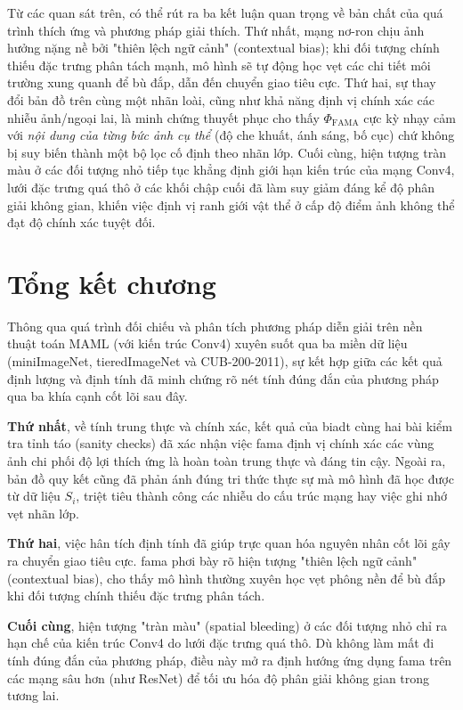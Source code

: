 Từ các quan sát trên, có thể rút ra ba kết luận quan trọng về bản chất của quá trình thích ứng và phương pháp giải thích. Thứ nhất, mạng nơ-ron chịu ảnh hưởng nặng nề bởi "thiên lệch ngữ cảnh" (contextual bias); khi đối tượng chính thiếu đặc trưng phân tách mạnh, mô hình sẽ tự động học vẹt các chi tiết môi trường xung quanh để bù đắp, dẫn đến chuyển giao tiêu cực. Thứ hai, sự thay đổi bản đồ trên cùng một nhãn loài, cũng như khả năng định vị chính xác các nhiễu ảnh/ngoại lai, là minh chứng thuyết phục cho thấy $\Phi_{\text{FAMA}}$ cực kỳ nhạy cảm với \emph{nội dung của từng bức ảnh cụ thể} (độ che khuất, ánh sáng, bố cục) chứ không bị suy biến thành một bộ lọc cố định theo nhãn lớp. Cuối cùng, hiện tượng tràn màu ở các đối tượng nhỏ tiếp tục khẳng định giới hạn kiến trúc của mạng Conv4, lưới đặc trưng quá thô ở các khối chập cuối đã làm suy giảm đáng kể độ phân giải không gian, khiến việc định vị ranh giới vật thể ở cấp độ điểm ảnh không thể đạt độ chính xác tuyệt đối.

\section{Tổng kết chương}
\label{sec:chapter4_summary}

Thông qua quá trình đối chiếu và phân tích phương pháp diễn giải trên nền thuật toán MAML (với kiến trúc Conv4) xuyên suốt qua ba miền dữ liệu (miniImageNet, tieredImageNet và CUB-200-2011), sự kết hợp giữa các kết quả định lượng và định tính đã minh chứng rõ nét tính đúng đắn của phương pháp qua ba khía cạnh cốt lõi sau đây.

\textbf{Thứ nhất}, về tính trung thực và chính xác, kết quả của \acrshort{biadt} cùng hai bài kiểm tra tỉnh táo (sanity checks) đã xác nhận việc \acrshort{fama} định vị chính xác các vùng ảnh chi phối độ lợi thích ứng là hoàn toàn trung thực và đáng tin cậy. Ngoài ra, bản đồ quy kết cũng đã phản ánh đúng tri thức thực sự mà mô hình đã học được từ dữ liệu $S_i$, triệt tiêu thành công các nhiễu do cấu trúc mạng hay việc ghi nhớ vẹt nhãn lớp.

\textbf{Thứ hai}, việc hân tích định tính đã giúp trực quan hóa nguyên nhân cốt lõi gây ra chuyển giao tiêu cực. \acrshort{fama} phơi bày rõ hiện tượng "thiên lệch ngữ cảnh" (contextual bias), cho thấy mô hình thường xuyên học vẹt phông nền để bù đắp khi đối tượng chính thiếu đặc trưng phân tách.

\textbf{Cuối cùng}, hiện tượng "tràn màu" (spatial bleeding) ở các đối tượng nhỏ chỉ ra hạn chế của kiến trúc Conv4 do lưới đặc trưng quá thô. Dù không làm mất đi tính đúng đắn của phương pháp, điều này mở ra định hướng ứng dụng \acrshort{fama} trên các mạng sâu hơn (như ResNet) để tối ưu hóa độ phân giải không gian trong tương lai.
